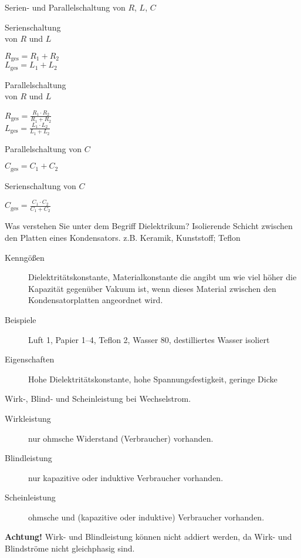 \documentclass[avery5371,grid,frame,a4paper]{flashcards}
\newcommand{\card}[3]{
  \begin{flashcard}[{\chap} -- #1]{#2}#3\end{flashcard}
}
\begin{document}
\card{11}{Serien- und Parallelschaltung von $R$, $L$, $C$}{
  \begin{minipage}{0.5\textwidth}
    \centering
    Serienschaltung \\ von $R$ und $L$
    \begin{center}
      $ R_{\text{ges}} = R_1 + R_2 $ \\
      $ L_{\text{ges}} = L_1 + L_2 $
    \end{center}
    Parallelschaltung \\ von $R$ und $L$
    \begin{center}
      $ {R_{\text{ges}}} = \frac{R_1 \cdot R_2}{R_1 + R_2} $ \\
      $ {L_{\text{ges}}} = \frac{L_1 \cdot L_2}{L_1 + L_2} $
    \end{center}
  \end{minipage}
  \begin{minipage}{0.49\textwidth}
    \centering
    Parallelschaltung von $C$
    \begin{center}
      $ C_{\text{ges}} = C_1 + C_2 $
    \end{center}
    Serienschaltung von $C$
    \begin{center}
      $ {C_{\text{ges}}} = \frac{C_1 \cdot C_2}{C_1 + C_2} $
    \end{center}
  \end{minipage}
}


\card{12}{Was verstehen Sie unter dem Begriff Dielektrikum?}{
  Isolierende Schicht zwischen den Platten eines Kondensators. z.B. Keramik, Kunststoff; Teflon
  {\small
    \begin{description}
      \item[Kenngößen]
        Dielektritätskonstante, Materialkonstante die angibt um wie viel höher die Kapazität gegenüber Vakuum ist, wenn dieses Material zwischen den Kondensatorplatten angeordnet wird.
      \item[Beispiele] Luft 1, Papier 1--4, Teflon 2, Wasser 80, destilliertes Wasser isoliert
      \item[Eigenschaften] Hohe Dielektritätskonstante, hohe Spannungsfestigkeit, geringe Dicke
    \end{description}
  }
}

\card{13}{Wirk-, Blind- und Scheinleistung bei Wechselstrom.}{
  \begin{description}
    \item[Wirkleistung] nur ohmsche Widerstand (Verbraucher) vorhanden.
    \item[Blindleistung] nur kapazitive oder induktive Verbraucher vorhanden.
    \item[Scheinleistung] ohmsche und (kapazitive oder induktive) Verbraucher vorhanden.
  \end{description}
  {\small
    \textbf{Achtung!}
      Wirk- und Blindleistung können nicht addiert werden,
      da Wirk- und Blindströme nicht gleichphasig sind.
  }
}
\end{document}
